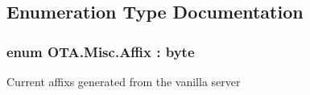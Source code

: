 \subsection{Enumeration Type Documentation}
\hypertarget{namespace_o_t_a_1_1_misc_a34e010400257b58a0335147ded52d71f}{}
\subsubsection[{Affix}]{\setlength{\rightskip}{0pt plus 5cm}enum {\bf O\+T\+A.\+Misc.\+Affix} \+: byte\hspace{0.3cm}{\ttfamily [strong]}}\label{namespace_o_t_a_1_1_misc_a34e010400257b58a0335147ded52d71f}


Current affix\textquotesingle{}s generated from the vanilla server 

